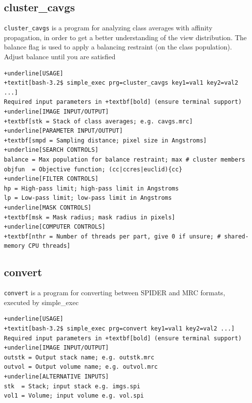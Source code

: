 \documentclass[a4paper,11pt]{article}
\newcommand{\prgname}[1]{\textcolor{NavyBlue}{\texttt{#1}}}
\begin{document}
\subsection{cluster\_cavgs}
\label{cluster_cavgs}
\prgname{cluster\_cavgs} is a program for analyzing class averages with affinity propagation, in order to get a better understanding of the view distribution. The balance flag is used to apply a balancing restraint (on the class population). Adjust balance until you are satisfied
\begin{Verbatim}[commandchars=+\[\],fontsize=\small,breaklines=true]
+underline[USAGE]
+textit[bash-3.2$ simple_exec prg=cluster_cavgs key1=val1 key2=val2 ...]
Required input parameters in +textbf[bold] (ensure terminal support)
+underline[IMAGE INPUT/OUTPUT]
+textbf[stk = Stack of class averages; e.g. cavgs.mrc]
+underline[PARAMETER INPUT/OUTPUT]
+textbf[smpd = Sampling distance; pixel size in Angstroms]
+underline[SEARCH CONTROLS]
balance = Max population for balance restraint; max # cluster members
objfun  = Objective function; (cc|ccres|euclid){cc}
+underline[FILTER CONTROLS]
hp = High-pass limit; high-pass limit in Angstroms
lp = Low-pass limit; low-pass limit in Angstroms
+underline[MASK CONTROLS]
+textbf[msk = Mask radius; mask radius in pixels]
+underline[COMPUTER CONTROLS]
+textbf[nthr = Number of threads per part, give 0 if unsure; # shared-memory CPU threads]
\end{Verbatim}

\subsection{convert}
\label{convert}
\prgname{convert} is a program for converting between SPIDER and MRC formats, executed by simple\_exec
\begin{Verbatim}[commandchars=+\[\],fontsize=\small,breaklines=true]
+underline[USAGE]
+textit[bash-3.2$ simple_exec prg=convert key1=val1 key2=val2 ...]
Required input parameters in +textbf[bold] (ensure terminal support)
+underline[IMAGE INPUT/OUTPUT]
outstk = Output stack name; e.g. outstk.mrc
outvol = Output volume name; e.g. outvol.mrc
+underline[ALTERNATIVE INPUTS]
stk  = Stack; input stack e.g. imgs.spi
vol1 = Volume; input volume e.g. vol.spi
\end{Verbatim}
\end{document}
